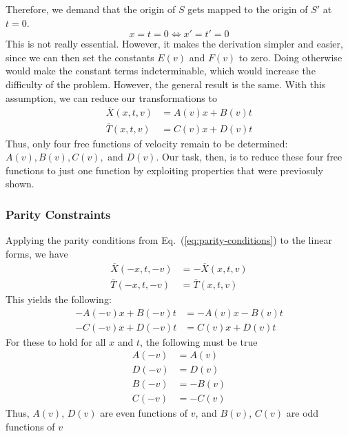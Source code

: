 		Therefore, we demand that the origin of $S$ gets mapped to the origin of $S'$ at $t=0$.
		\begin{equation}
			x = t = 0 \iff x' = t' = 0
		\end{equation}
		This is not really essential. However, it makes the derivation simpler and easier, since we can
		then set the constants $E(v)$ and $F(v)$ to zero. Doing otherwise would make the constant 
		terms indeterminable, which would increase the difficulty of the problem. However, the general
		result is the same. With this assumption, we can reduce our transformations to
		\begin{equation}
			\begin{aligned}
				\overline{X}(x,t,v) &= A(v)x + B(v)t \\
				\overline{T}(x,t,v) &= C(v)x + D(v)t
			\end{aligned}
			\label{eq:linear-no-constants}
		\end{equation}
		Thus, only four free functions of velocity  remain to be determined: $A(v), B(v), C(v),$ and $D(v)$.
		Our task, then, is to reduce these four free functions to just one function by exploiting properties
		that were previosuly shown. 

	\subsubsection{Parity Constraints}
		Applying the parity conditions from Eq.~(\ref{eq:parity-conditions}) to the linear forms, we have
		\begin{equation}
			\begin{aligned}
				\overline{X}(-x,t,-v) &= -\overline{X}(x,t,v) \\
				\overline{T}(-x,t,-v) &= \overline{T}(x,t,v)
			\end{aligned}
		\end{equation}
		This yields the following:
		\begin{equation}
			\begin{aligned}
				-A(-v)x + B(-v)t &= -A(v)x - B(v)t \\
				-C(-v)x + D(-v)t &= C(v)x + D(v)t
			\end{aligned}
			\label{eq:parity-linear}
		\end{equation}
		For these to hold for all $x$ and $t$, the following must be true
		\begin{equation}
			\begin{aligned}
				A(-v)&=A(v)\\
				D(-v)&=D(v)\\
				B(-v)&=-B(v)\\
				C(-v)&=-C(v)
			\end{aligned}
			\label{eq:parity-results}
		\end{equation}
		Thus, $A(v)$, $D(v)$ are even functions of $v$, and $B(v)$, $C(v)$ are odd functions of $v$
